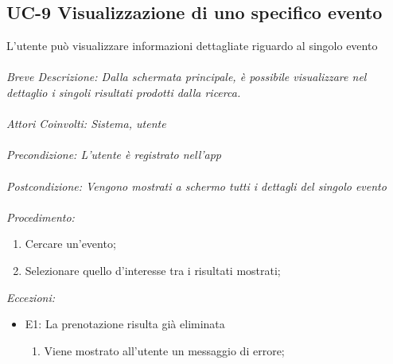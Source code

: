 \subsection{UC-9 Visualizzazione di uno specifico evento}
L'utente può visualizzare informazioni dettagliate riguardo al singolo evento
\\
\\
\textit{Breve Descrizione: Dalla schermata principale, è possibile visualizzare nel dettaglio i singoli risultati prodotti dalla ricerca.} 
\\
\\
\textit{Attori Coinvolti: Sistema, utente}
\\
\\
\textit{Precondizione: L'utente è registrato nell'app}
\\
\\
\textit{Postcondizione: Vengono mostrati a schermo tutti i dettagli del singolo evento}
\\
\\
\textit{Procedimento:}
\begin{enumerate}
	\item Cercare un'evento;
	\item Selezionare quello d'interesse tra i risultati mostrati;
\end{enumerate}


\textit{Eccezioni:}
\begin{itemize}
	\item E1: La prenotazione risulta già eliminata
	\begin{enumerate}
		\item Viene mostrato all'utente un messaggio di errore;
	\end{enumerate}
\end{itemize}